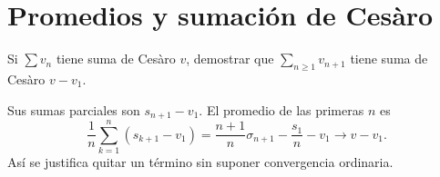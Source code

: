 
\chapter{Promedios y sumación de Cesàro}

\begin{ejercicio}\label{ej:v4-l01-1}
Si $\sum v_n$ tiene suma de Cesàro $v$, demostrar que $\sum_{n\geq1}v_{n+1}$ tiene suma de Cesàro $v-v_1$.
\end{ejercicio}
\begin{solucion}
Sus sumas parciales son $s_{n+1}-v_1$. El promedio de las primeras $n$ es
\[
 \frac1n\sum_{k=1}^n(s_{k+1}-v_1)
 =\frac{n+1}{n}\sigma_{n+1}-\frac{s_1}{n}-v_1\longrightarrow v-v_1.
\]
Así se justifica quitar un término sin suponer convergencia ordinaria.
\end{solucion}

